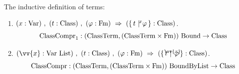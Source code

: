 \begin{metadefinition}%
The inductive definition of terms:
\begin{enumerate}
\item $(x:\Var)\ ,\ (t:\Class)\ ,\ (\phi:\Fm) \Implies (\ccc{x}{t}{\phi} :\Class)$.
\[
\text{ClassCompr}_1 : ({\text{ClassTerm}}, ({\text{ClassTerm}} \times \mathrm{Fm}))\ \mathrm{Bound} \to {\text{Class}}
\]
\item $(\vv{x}:\text{Var List})\ ,\ (t:\Class)\ ,\ (\phi:\Fm) \Implies (\ccc{\vv{x}}{t}{\phi} :\Class)$.
\[
\text{ClassCompr} : ({\text{ClassTerm}}, ({\text{ClassTerm}} \times \mathrm{Fm}))\ \text{BoundByList} \to {\text{Class}}
\]

\end{enumerate}
\end{metadefinition}
